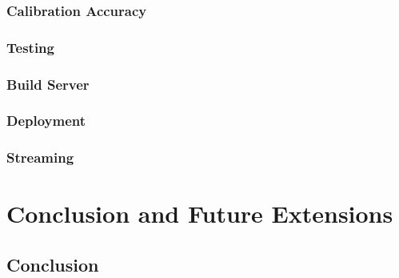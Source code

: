 \documentclass{article}
\begin{document}
\subsubsection{Calibration Accuracy}
\subsubsection{Testing}
\subsubsection{Build Server}
\subsubsection{Deployment} %
\subsubsection{Streaming}

\newpage
\section{Conclusion and Future Extensions}
\subsection{Conclusion}
\end{document}
